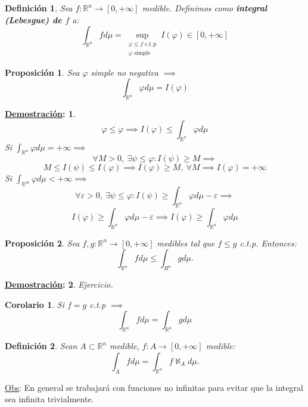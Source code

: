 \documentclass[10pt,a4paper,openright]{book}
\theoremstyle{break}
\newtheorem*{defi}{Definición}
\newtheorem*{coro}{Corolario}
\newtheorem*{prop}{Proposición}
\newtheorem*{demo}{\underline{Demostración}:}
\begin{document}
\begin{defi}
Sea $f: \mathbb{R}^n \to \left[0, +\infty\right]$ medible. Definimos como \textbf{integral (Lebesgue) de $f$} a:
$$\int_{\mathbb{R}^n}f d\mu = \sup_{\substack{\varphi \le f \text{ c.t.p} \\ \varphi \text{ simple}}} I\left(\varphi\right) \in \left[0, +\infty\right]$$
\end{defi}

\begin{prop}
Sea $\varphi$ simple no negativa $\implies$
$$\int_{\mathbb{R}^n}\varphi d \mu = I\left(\varphi\right)$$
\end{prop}
\begin{demo}
$$\varphi \le \varphi \implies I\left(\varphi\right) \le \int_{\mathbb{R}^n} \varphi d \mu$$
Si $\int_{\mathbb{R}^n} \varphi d \mu = +\infty \implies$
$$\forall M > 0,\ \exists \psi \le \varphi: I\left(\psi\right) \ge M \implies$$
$$M \le I\left(\psi\right) \le I\left(\varphi\right) \implies I\left(\varphi\right) \ge M,\ \forall M \implies I\left(\varphi\right) = +\infty$$
Si $\int_{\mathbb{R}^m}\varphi d \mu < +\infty \implies$
$$\forall \varepsilon > 0,\ \exists \psi \le \varphi: I\left(\psi\right) \ge \int_{\mathbb{R}^n}\varphi d \mu - \varepsilon \implies$$
$$I\left(\varphi\right) \ge \int_{\mathbb{R}^n}\varphi d \mu - \varepsilon \implies I\left(\varphi\right) \ge \int_{\mathbb{R}^n}\varphi d \mu$$
\end{demo}

\begin{prop}
Sea $f, g: \mathbb{R}^n \to \left[0, +\infty\right]$ medibles tal que $f \le g$ c.t.p. Entonces:
$$\int_{\mathbb{R}^n}f d \mu \le \int_{R^n}g d \mu.$$
\end{prop}
\begin{demo}
Ejercicio.
\end{demo}

\begin{coro}
Si $f = g$ c.t.p $\implies$
$$\int_{\mathbb{R}^n}f d \mu = \int_{\mathbb{R}^n}g d \mu$$
\end{coro}

\begin{defi}
Sean $A \subset \mathbb{R}^n$ medible, $f: A \to \left[0, +\infty\right]$ medible:
$$\int_A f d \mu = \int_{\mathbb{R}^n}f \aleph_{A} d \mu.$$
\end{defi}
\underline{Obs}:
En general se trabajará con funciones no infinitas para evitar que la integral sea infinita trivialmente.
\end{document}
